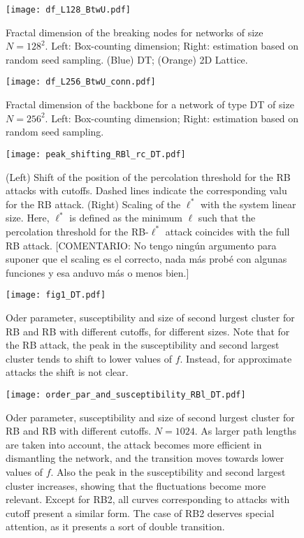 \documentclass{article}
\begin{document}
\begin{figure}
\centering
\texttt{[image: df\_L128\_BtwU.pdf]}
\caption{\label{fig:fractal_dimension} Fractal dimension of the breaking nodes for networks of size $N=128^2$. Left: Box-counting dimension; Right: estimation based on random seed sampling. (Blue) DT; (Orange) 2D Lattice.}
\end{figure}

\begin{figure}
\centering
\texttt{[image: df\_L256\_BtwU\_conn.pdf]}
\caption{\label{fig:fractal_dimension_backbone} Fractal dimension of the backbone for a network of type DT of size $N=256^2$. Left: Box-counting dimension; Right: estimation based on random seed sampling.}
\end{figure}




\begin{figure}
\centering
\texttt{[image: peak\_shifting\_RBl\_rc\_DT.pdf]}
\caption{(Left) Shift of the position of the percolation threshold for the RB attacks with cutoffs. Dashed lines indicate the corresponding valu for the RB attack. (Right) Scaling of the $\ell^*$ with the system linear size. Here, $\ell^*$ is defined as the minimum $\ell$ such that the percolation threshold  for the RB-$\ell^*$ attack coincides with the full RB attack. [COMENTARIO: No tengo ning\'un argumento para suponer que el scaling es el correcto, nada m\'as prob\'e con algunas funciones y esa anduvo m\'as o menos bien.]}
\end{figure}




\begin{figure}
\centering
\texttt{[image: fig1\_DT.pdf]}
\caption{Oder parameter, susceptibility and size of second lurgest cluster for RB and RB with different cutoffs, for different sizes. Note that for the RB attack, the peak in the susceptibility and second largest cluster tends to shift to lower values of $f$. Instead, for approximate attacks the shift is not clear.}
\end{figure}

\begin{figure}
\centering
\texttt{[image: order\_par\_and\_susceptibility\_RBl\_DT.pdf]}
\caption{Oder parameter, susceptibility and size of second lurgest cluster for RB and RB with different cutoffs. $N = 1024$. As larger path lengths are taken into account, the attack becomes more efficient in dismantling the network, and the transition moves towards lower values of $f$. Also the peak in the susceptibility and second largest cluster increases, showing that the fluctuations become more relevant. Except for RB2, all curves corresponding to attacks with cutoff present a similar form. The case of RB2 deserves special attention, as it presents a sort of double transition.}
\end{figure}
\end{document}
